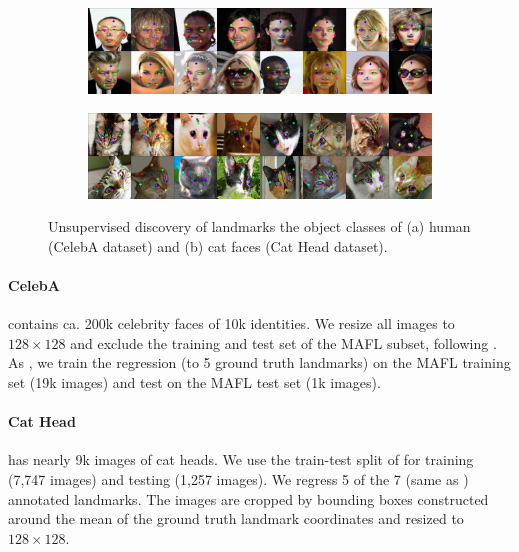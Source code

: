 		\begin{figure}[htp]
			\centering
			\begin{subfigure}{1.\textwidth}
			\includegraphics[trim={0cm 0cm 0cm 0cm},clip, width=1.\linewidth]{fig/shape/0celeba}\caption{}
			\end{subfigure}
			\begin{subfigure}{1.\textwidth}
			\includegraphics[trim={0cm 0cm 0cm 0cm},clip, width=1.\linewidth]{fig/shape/0cats}\caption{}
			\end{subfigure}
			\caption{{Unsupervised discovery of landmarks the object classes of (a) human (CelebA dataset) and (b) cat faces (Cat Head dataset).}}
			\label{fig:kp_faces}
		\end{figure}

		\paragraph{CelebA} \cite{liu15facewild} contains ca. 200k celebrity faces of 10k identities.
		We resize all images to $128\times 128$ and exclude the training and test set of the MAFL subset, following \cite{thewlis17}.
		As  \cite{thewlis17, zhang18}, we train the regression (to 5 ground truth landmarks) on the MAFL training set (19k images) and test on the MAFL test set (1k images).

		\paragraph{Cat Head} \cite{zhang08cathead}  has nearly 9k images of cat heads.
		We use the train-test split of \cite{zhang18} for training (7,747 images) and testing (1,257 images).
		We regress 5 of the 7 (same as \cite{zhang18}) annotated landmarks.
		The images are cropped by bounding boxes constructed around the mean of the ground truth landmark coordinates and resized to $128\times128$.

